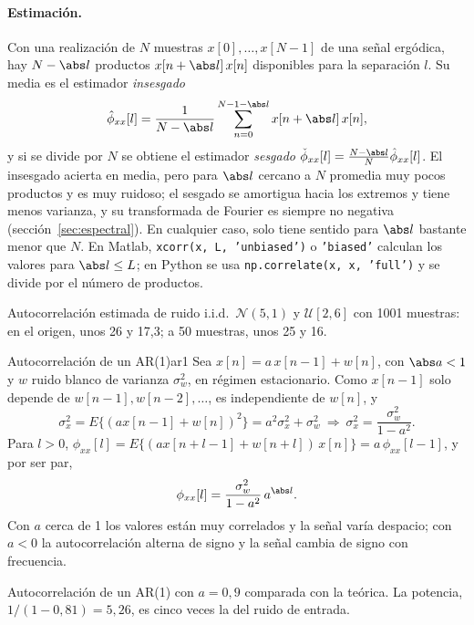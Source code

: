 \documentclass[11pt,a4paper]{scrartcl}
\begin{document}
\paragraph{Estimación.} Con una realización de $N$ muestras $x[0],\dots,x[N-1]$ de una señal ergódica, hay $N-\abs l$ productos $x[n+\abs l]\,x[n]$ disponibles para la separación $l$. Su media es el estimador \emph{insesgado}
\[
  \hat\phi_{xx}[l]=\frac1{N-\abs l}\sum_{n=0}^{N-1-\abs l}x[n+\abs l]\,x[n],
\]
y si se divide por $N$ se obtiene el estimador \emph{sesgado} $\check\phi_{xx}[l]=\frac{N-\abs l}N\hat\phi_{xx}[l]$. El insesgado acierta en media, pero para $\abs l$ cercano a $N$ promedia muy pocos productos y es muy ruidoso; el sesgado se amortigua hacia los extremos y tiene menos varianza, y su transformada de Fourier es siempre no negativa (sección~\ref{sec:espectral}). En cualquier caso, solo tiene sentido para $\abs l$ bastante menor que $N$. En Matlab, \texttt{xcorr(x, L, 'unbiased')} o \texttt{'biased'} calculan los valores para $\abs l\le L$; en Python se usa \texttt{np.correlate(x, x, 'full')} y se divide por el número de productos.

\begin{encodigo}
  Autocorrelación estimada de ruido i.i.d.\ $\mathcal N(5,1)$ y $\mathcal U[2,6]$ con 1001 muestras: en el origen, unos 26 y 17,3; a 50 muestras, unos 25 y 16.
\end{encodigo}

\begin{ejemplo}{Autocorrelación de un AR(1)}{ar1}
  Sea $x[n]=a\,x[n-1]+w[n]$, con $\abs a<1$ y $w$ ruido blanco de varianza $\sigma_w^2$, en régimen estacionario. Como $x[n-1]$ solo depende de $w[n-1],w[n-2],\dots$, es independiente de $w[n]$, y
  \[
    \sigma_x^2=E\{(ax[n-1]+w[n])^2\}=a^2\sigma_x^2+\sigma_w^2\ \Rightarrow\ \sigma_x^2=\frac{\sigma_w^2}{1-a^2}.
  \]
  Para $l>0$, $\phi_{xx}[l]=E\{(ax[n+l-1]+w[n+l])\,x[n]\}=a\,\phi_{xx}[l-1]$, y por ser par,
  \[
    \phi_{xx}[l]=\frac{\sigma_w^2}{1-a^2}\,a^{\abs l}.
  \]
  Con $a$ cerca de 1 los valores están muy correlados y la señal varía despacio; con $a<0$ la autocorrelación alterna de signo y la señal cambia de signo con frecuencia.
\end{ejemplo}

\begin{encodigo}
  Autocorrelación de un AR(1) con $a=0{,}9$ comparada con la teórica. La potencia, $1/(1-0{,}81)=5{,}26$, es cinco veces la del ruido de entrada.
\end{encodigo}
\end{document}
